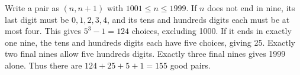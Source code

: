 Write a pair as $(n,n+1)$ with $1001\le n\le1999$. If $n$ does not end in nine, its last digit must be $0,1,2,3,4$, and its tens and hundreds digits each must be at most four. This gives $5^3-1=124$ choices, excluding 1000. If it ends in exactly one nine, the tens and hundreds digits each have five choices, giving 25. Exactly two final nines allow five hundreds digits. Exactly three final nines gives 1999 alone. Thus there are $124+25+5+1=\boxed{155}$ good pairs.
